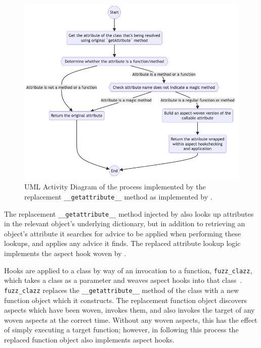 \begin{figure}
\includegraphics[width=0.9\columnwidth]{30_prior_work/diagrams/replacement_getattr.png}
\caption{UML Activity Diagram of the process implemented by the replacement
\lstinline{__getattribute__} method as implemented by \pydysofu{}.}
\label{fig:early_pdsf_replaced_getattr_diagram}
\end{figure}

The replacement \lstinline{__getattribute__} method injected by
\pydysofu{} also looks up attributes in the relevant object's underlying dictionary,
but in addition to retrieving an object's attribute it searches for advice to be
applied when performing these lookups, and applies any advice it finds. The
replaced attribute lookup logic implements the aspect hook woven by \pydysofu{}.

Hooks are applied to a class by way of an invocation to a function,
\lstinline{fuzz_clazz}, which takes a class as a parameter and weaves aspect
hooks into that class~\cite{pdsf_repo,asp_repo}. \lstinline{fuzz_clazz} replaces
the \lstinline{__getattribute__} method of the class with a new function
object which it constructs. The replacement function object discovers aspects
which have been woven, invokes them, and also invokes the target of any woven
aspects at the correct time. Without any woven aspects, this has the effect of
simply executing a target function; however, in following this process the
replaced function object also implements aspect hooks.

